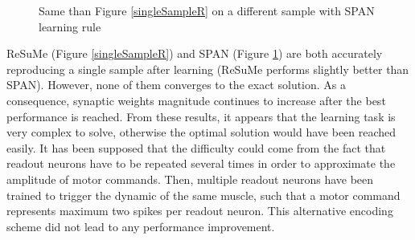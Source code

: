 \documentclass[11pt, a4paper]{article} %
\begin{document}
\begin{figure}
\center
{}
\caption{Same than Figure \ref{singleSampleR} on a different sample with SPAN learning rule}
\label{singleSampleS}
\end{figure}

ReSuMe (Figure \ref{singleSampleR}) and SPAN (Figure \ref{singleSampleS}) are both accurately reproducing a single sample after learning (ReSuMe performs slightly better than SPAN). However, none of them converges to the exact solution. As a consequence, synaptic weights magnitude continues to increase after the best performance is reached. From these results, it appears that the learning task is very complex to solve, otherwise the optimal solution would have been reached easily. It has been supposed that the difficulty could come from the fact that readout neurons have to be repeated several times in order to approximate the amplitude of motor commands. Then, multiple readout neurons have been trained to trigger the dynamic of the same muscle, such that a motor command represents maximum two spikes per readout neuron. This alternative encoding scheme did not lead to any performance improvement.
\end{document}
